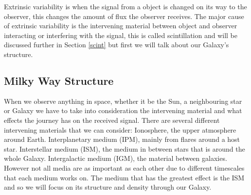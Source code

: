 \documentclass[10pt,a4paper]{article}
\begin{document}
Extrinsic variability is when the signal from a object is changed on its way to the observer, this changes the amount of flux the observer receives. The major cause of extrinsic variability is the intervening material between object and observer interacting or interfering with the signal, this is called scintillation and will be discussed further in Section \ref{scint} but first we will talk about our Galaxy's structure.\\

\subsection{Milky Way Structure}
When we observe anything in space, whether it be the Sun, a neighbouring star or Galaxy we have to take into consideration the intervening material and what effects the journey has on the received signal. There are several different intervening materials that we can consider: Ionosphere, the upper atmosphere around Earth. Interplanetary medium (IPM), mainly from flares around a host star. Interstellar medium (ISM), the medium in between stars that is around the whole Galaxy. Intergalactic medium (IGM), the material between galaxies. However not all media are as important as each other due to different timescales that each medium works on. The medium that has the greatest effect is the ISM and so we will focus on its structure and density through our Galaxy.\\
\end{document}

